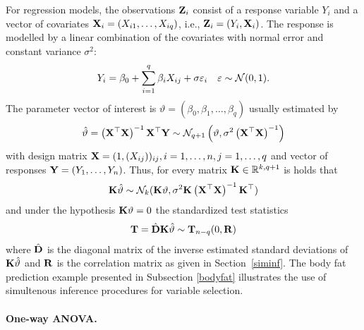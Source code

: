 \documentclass[12pt]{article}
\begin{document}
For regression models, the observations $\mathbf{Z}_i$ consist of a response
variable $Y_i$ and a vector of covariates $\mathbf{X}_i = (X_{i1}, \dots, X_{iq})$, 
i.e., $\mathbf{Z}_i = (Y_i, \mathbf{X}_i)$. The response is modelled by a linear
combination of the covariates with normal error and constant variance $\sigma^2$:
\begin{eqnarray*}
Y_i = \beta_0 + \sum_{i = 1}^q \beta_i X_{ij} + \sigma \varepsilon_i \quad 
      \varepsilon \sim \mathcal{N}(0, 1).
\end{eqnarray*}
The parameter vector of interest is $\vartheta = (\beta_0, \beta_1, \dots, \beta_q)$
usually estimated by 
\begin{eqnarray*}
\hat{\vartheta} = \left(\mathbf{X}^\top\mathbf{X}\right)^{-1} \mathbf{X}^\top \mathbf{Y} 
\sim \mathcal{N}_{q+1}\left(\vartheta, \sigma^2 \left(\mathbf{X}^\top\mathbf{X}\right)^{-1}\right)
\end{eqnarray*}
with design matrix $\mathbf{X} = (1, (X_{ij}))_{ij}, i = 1, \dots, n, j = 1, \dots, q$ and
vector of responses $\mathbf{Y} = (Y_1, \dots, Y_n)$. Thus,
for every matrix $\mathbf{K} \in \mathbb{R}^{k,q+1}$ is holds that
\begin{eqnarray*}
\mathbf{K} \hat{\vartheta} \sim \mathcal{N}_k(\mathbf{K} \vartheta, \sigma^2 \mathbf{K} \left(\mathbf{X}^\top\mathbf{X}\right)^{-1} \mathbf{K}^\top)
\end{eqnarray*}
and under the hypothesis $\mathbf{K} \vartheta = 0$ the standardized test statistics
\begin{eqnarray*}
\mathbf{T} = \hat{\mathbf{D}} \mathbf{K} \hat{\vartheta} \sim \mathbf{T}_{n - q}(0, \mathbf{R})
\end{eqnarray*}
where $\hat{\mathbf{D}}$ is the diagonal matrix of the inverse estimated 
standard deviations of $\mathbf{K} \hat{\vartheta}$ and $\mathbf{R}$ is the correlation matrix
as given in Section~\ref{siminf}. The body fat prediction example
presented in Subsection \ref{bodyfat} illustrates the use of simultenous
inference procedures for variable selection.

\paragraph{One-way ANOVA.}
\end{document}
